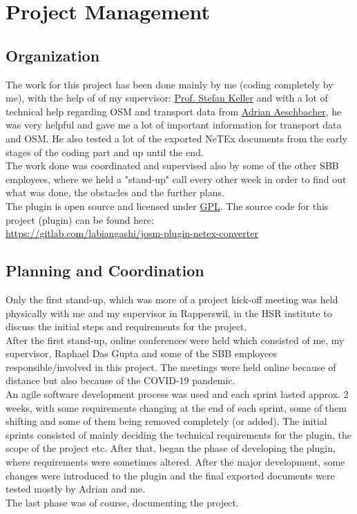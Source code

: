 \chapter{Project Management}
\section{Organization}
The work for this project has been done mainly by me (coding completely by me), with the help of of my supervisor: \href{mailto:stefan.keller@hsr.ch}{Prof. Stefan Keller} and with a lot of technical help regarding OSM and transport data from \href{mailto:adrian.aeschbacher2@sbb.ch}{Adrian Aeschbacher}, he was very helpful and gave me a lot of important information for transport data and OSM. He also tested a lot of the exported NeTEx documents from the early stages of the coding part and up until the end.\\
\newline
The work done was coordinated and supervised also by some of the other SBB employees, where we held a "stand-up" call every other week in order to find out what was done, the obstacles and the further plans.\\
The plugin is open source and licensed under \href{https://www.gnu.org/licenses/gpl-3.0.en.html}{GPL}.
\newline
The source code for this project (plugin) can be found here:\\ \href{https://gitlab.com/labiangashi/josm-plugin-netex-converter}{https://gitlab.com/labiangashi/josm-plugin-netex-converter}
\newpage
\section{Planning and Coordination}
Only the first stand-up, which was more of a project kick-off meeting was held physically with me and my supervisor in Rapperswil, in the HSR institute to discuss the initial steps and requirements for the project.\\
After the first stand-up, online conferences were held which consisted of me, my supervisor, Raphael Das Gupta and some of the SBB employees responsible/involved in this project. The meetings were held online because of distance but also because of the COVID-19 pandemic.\\
An agile software development process was used and each sprint lasted approx. 2 weeks, with some requirements changing at the end of each sprint, some of them shifting and some of them being removed completely (or added). The initial sprints consisted of mainly deciding the technical requirements for the plugin, the scope of the project etc. After that, began the phase of developing the plugin, where requirements were sometimes altered. After the major development, some changes were introduced to the plugin and the final exported documents were tested mostly by Adrian and me.\\
The last phase was of course, documenting the project.
